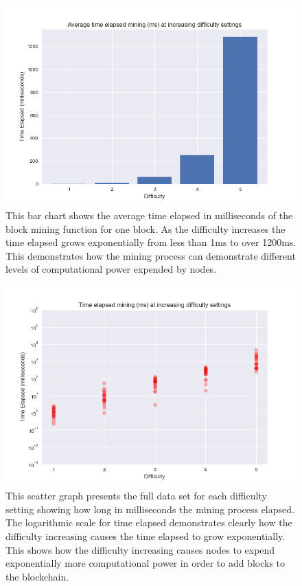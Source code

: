\documentclass{l4proj}
\begin{document}
\begin{figure}[!ht]
    \centering
    \includegraphics[width=1\linewidth]{images/avgBar.png}    
    \caption
    {
        This bar chart shows the average time elapsed in milliseconds of the block mining function for one block.
        As the difficulty increases the time elapsed grows exponentially from less than 1ms to over 1200ms. This
        demonstrates how the mining process can demonstrate different levels of computational power expended by
        nodes.
    }
    \label{fig:avgBar} 
\end{figure}

\begin{figure}[!ht]
    \centering
    \includegraphics[width=1\linewidth]{images/fulldatascatter.png}    
    \caption
    {
        This scatter graph presents the full data set for each difficulty setting showing how long in milliseconds
        the mining process elapsed. The logarithmic scale for time elapsed demonstrates clearly how the difficulty
        increasing causes the time elapsed to grow exponentially. This shows how the difficulty increasing causes
        nodes to expend exponentially more computational power in order to add blocks to the blockchain.
    }
    \label{fig:fulldatascatter} 
\end{figure}
\end{document}
